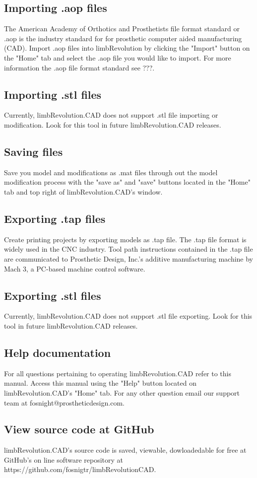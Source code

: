 \documentclass[twoside,a4paper]{refrep}
\begin{document}
	\subsection{Importing .aop files}
	The American Academy of Orthotics and Prosthetists file format standard or .aop is the industry standard for for prosthetic computer aided manufacturing (CAD). Import .aop files into limbRevolution by clicking the "Import" button on the "Home" tab and select the .aop file you would like to import. For more information the .aop file format standard see ???.
	\subsection{Importing .stl files}
	Currently, limbRevolution.CAD does not support .stl file importing or modification. Look for this tool in future limbRevolution.CAD releases.
	\subsection{Saving files}
	Save you model and modifications as .mat files through out the model modification process with the "save as" and "save" buttons located in the "Home" tab and top right of limbRevolution.CAD's window.
	\subsection{Exporting .tap files}
	Create printing projects by exporting models as .tap file. The .tap file format is widely used in the CNC industry. Tool path instructions contained in the .tap file are communicated to Prosthetic Design, Inc.'s additive manufacturing machine by Mach 3, a PC-based machine control software.
	\subsection{Exporting .stl files}
	Currently, limbRevolution.CAD does not support .stl file exporting. Look for this tool in future limbRevolution.CAD releases.
	\subsection{Help documentation}
	For all questions pertaining to operating limbRevolution.CAD refer to this manual. Access this manual using the "Help" button located on limbRevolution.CAD's "Home" tab. For any other question email our support team at fosnight@prostheticdesign.com.
	\subsection{View source code at GitHub}
	limbRevolution.CAD's source code is saved, viewable, dowloadedable for free at GitHub's on line software repository at https://github.com/fosnigtr/limbRevolutionCAD.
\end{document}
